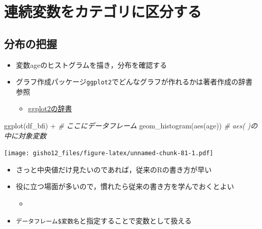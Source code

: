 \documentclass[
  xelatex,ja=standard, b5paper]{bxjsbook}
\newenvironment{Shaded}{\begin{snugshade}}{\end{snugshade}}
\newcommand{\CommentTok}[1]{\textcolor[rgb]{0.56,0.35,0.01}{\textit{#1}}}
\newcommand{\FunctionTok}[1]{\textcolor[rgb]{0.00,0.00,0.00}{#1}}
\newcommand{\NormalTok}[1]{#1}
\newcommand{\SpecialCharTok}[1]{\textcolor[rgb]{0.00,0.00,0.00}{#1}}
\providecommand{\tightlist}{%
  \setlength{\itemsep}{0pt}\setlength{\parskip}{0pt}}
\begin{document}
\hypertarget{ux9023ux7d9aux5909ux6570ux3092ux30abux30c6ux30b4ux30eaux306bux533aux5206ux3059ux308b}{%
\section{連続変数をカテゴリに区分する}\label{ux9023ux7d9aux5909ux6570ux3092ux30abux30c6ux30b4ux30eaux306bux533aux5206ux3059ux308b}}

\hypertarget{ux5206ux5e03ux306eux628aux63e1}{%
\subsection{分布の把握}\label{ux5206ux5e03ux306eux628aux63e1}}

\begin{itemize}
\tightlist
\item
  変数ageのヒストグラムを描き，分布を確認する
\item
  グラフ作成パッケージ\texttt{ggplot2}でどんなグラフが作れるかは著者作成の辞書参照

  \begin{itemize}
  \tightlist
  \item
    \href{https://izunyan.github.io/practice_ggplot2/}{ggplot2の辞書}
  \end{itemize}
\end{itemize}

\begin{Shaded}
\begin{Highlighting}[]
\FunctionTok{ggplot}\NormalTok{(df\_bfi) }\SpecialCharTok{+}           \CommentTok{\# ここにデータフレーム}
  \FunctionTok{geom\_histogram}\NormalTok{(}\FunctionTok{aes}\NormalTok{(age)) }\CommentTok{\# aes( )の中に対象変数}
\end{Highlighting}
\end{Shaded}

\texttt{[image: gisho12\_files/figure-latex/unnamed-chunk-81-1.pdf]}

\begin{itemize}
\tightlist
\item
  さっと中央値だけ見たいのであれば，従来のRの書き方が早い
\item
  役に立つ場面が多いので，慣れたら従来の書き方を学んでおくとよい

  \begin{itemize}
  \tightlist
  \item
  \end{itemize}
\item
  \texttt{データフレーム\$変数名}と指定することで変数として扱える
\end{itemize}
\end{document}
